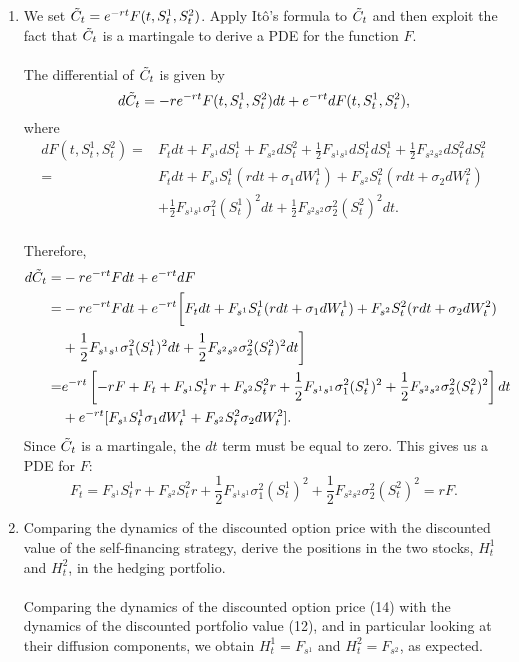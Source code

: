 \documentclass[handout,8pt]{beamer}
\begin{document}
\begin{frame}[allowframebreaks]{ }
\begin{enumerate}
\begin{enumerate}
        \item We set $\Tilde{C}_t = e^{-rt}F(t,S_t^1, S_t^2)$. Apply Itô's formula to $\Tilde{C}_t$ and then exploit the fact that $\Tilde{C}_t$ is a martingale to derive a PDE for the function $F$.\\\\
        The differential of $\Tilde{C}_t$ is given by
        \begin{equation*}
            d\Tilde{C}_t = -re^{-rt}F(t,S_t^1,S_t^2) dt + e^{-rt} dF(t,S_t^1, S_t^2),
        \end{equation*}
        where
        \begin{align*}
            dF(t,S_t^1,S_t^2) = &F_t dt + F_{s^1} dS_t^1 + F_{s^2} dS_t^2 + \frac{1}{2}F_{s^1s^1} dS_t^1dS_t^1 + \frac{1}{2}F_{s^2s^2} dS_t^2dS_t^2\\
            = &F_t dt + F_{s^1}S_t^1(r dt + \sigma_1 dW_t^1) + F_{s^2}S_t^2(r dt + \sigma_2 dW_t^2)\\
            &+\frac{1}{2}F_{s^1s^1}\sigma_1^2(S_t^1)^2 dt + \frac{1}{2}F_{s^2s^2}\sigma_2^2(S_t^2)^2 dt.
        \end{align*}\\
        Therefore,
        \begin{align}
            d\Tilde{C}_t = &-re^{-rt}F dt + e^{-rt} dF \nonumber\\
            = &-re^{-rt}F dt + e^{-rt}\bigg[F_t dt + F_{s^1}S_t^1(r dt + \sigma_1 dW_t^1) + F_{s^2}S_t^2(r dt + \sigma_2 dW_t^2) \nonumber\\
            &+\frac{1}{2}F_{s^1s^1}\sigma_1^2(S_t^1)^2 dt + \frac{1}{2}F_{s^2s^2}\sigma_2^2(S_t^2)^2 dt\bigg] \nonumber\\
            = &e^{-rt}\left[-rF + F_t + F_{s^1}S_t^1r + F_{s^2}S_t^2r + \frac{1}{2}F_{s^1s^1}\sigma_1^2(S_t^1)^2 + \frac{1}{2}F_{s^2s^2}\sigma_2^2(S_t^2)^2 \right] dt \nonumber\\
            &+e^{-rt}[F_{s^1}S_t^1\sigma_1 dW_t^1 + F_{s^2}S_t^2\sigma_2 dW_t^2].
        \end{align}
        Since $\Tilde{C}_t$ is a martingale, the $dt$ term must be equal to zero. This gives us a PDE for $F$:
        \begin{equation*}
            F_t = F_{s^1}S_t^1r + F_{s^2}S_t^2r + \frac{1}{2}F_{s^1s^1}\sigma_1^2(S_t^1)^2 + \frac{1}{2}F_{s^2s^2}\sigma_2^2(S_t^2)^2 = rF.
        \end{equation*}
        
        \item Comparing the dynamics of the discounted option price with the discounted value of the self-financing strategy, derive the positions in the two stocks, $H_t^1$ and $H_t^2$, in the hedging portfolio.\\\\
        Comparing the dynamics of the discounted option price (14) with the dynamics of the discounted portfolio value (12), and in particular looking at their diffusion components, we obtain $H_t^1=F_{s^1}$ and $H_t^2=F_{s^2}$, as expected.
    \end{enumerate}
    

\end{enumerate}
\end{frame}
\end{document}
